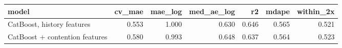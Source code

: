\begin{tabular}{lrrrrrr}
\toprule
model & cv_mae & mae_log & med_ae_log & r2 & mdape & within_2x \\
\midrule
CatBoost, history features & 0.553 & 1.000 & 0.630 & 0.646 & 0.565 & 0.521 \\
CatBoost + contention features & 0.580 & 0.993 & 0.648 & 0.637 & 0.564 & 0.523 \\
\bottomrule
\end{tabular}
